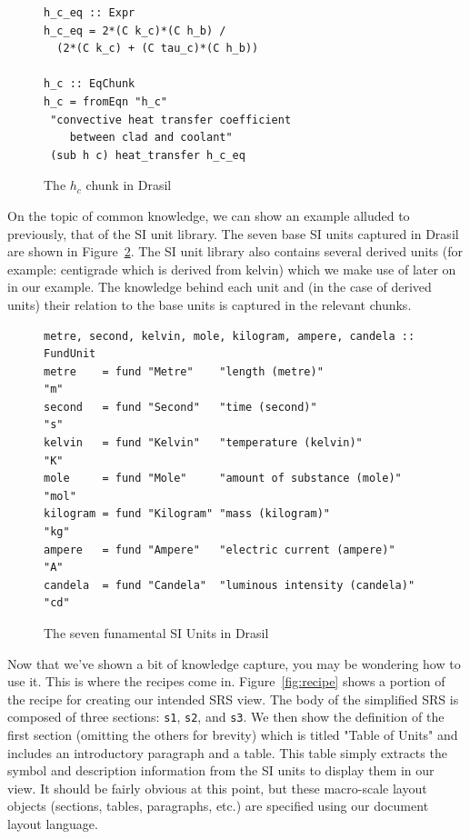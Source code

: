 \documentclass[preprint, 10pt]{sigplanconf}
\begin{document}
\begin{figure}
\begin{lstlisting}[frame=single, showstringspaces=false, basicstyle=\small]
h_c_eq :: Expr
h_c_eq = 2*(C k_c)*(C h_b) /
  (2*(C k_c) + (C tau_c)*(C h_b))

h_c :: EqChunk
h_c = fromEqn "h_c" 
 "convective heat transfer coefficient
    between clad and coolant"
 (sub h c) heat_transfer h_c_eq
\end{lstlisting}
\caption{The $h_c$ chunk in Drasil}
\label{fig:h_cChunk}
\end{figure}

On the topic of common knowledge, we can show an example alluded to previously,
that of the SI unit library. The seven base SI units captured in Drasil are
shown in Figure~\ref{fig:si_units}. The SI unit library also contains several
derived units (for example: centigrade which is derived from kelvin) which we
make use of later on in our example. The knowledge behind each unit and (in the
case of derived units) their relation to the base units is captured in the
relevant chunks.

\begin{figure}
\begin{lstlisting}[frame=single, showstringspaces=false]
metre, second, kelvin, mole, kilogram, ampere, candela :: FundUnit
metre    = fund "Metre"    "length (metre)"               "m"
second   = fund "Second"   "time (second)"                "s"
kelvin   = fund "Kelvin"   "temperature (kelvin)"         "K"
mole     = fund "Mole"     "amount of substance (mole)"   "mol"
kilogram = fund "Kilogram" "mass (kilogram)"              "kg"
ampere   = fund "Ampere"   "electric current (ampere)"    "A"
candela  = fund "Candela"  "luminous intensity (candela)" "cd"
\end{lstlisting}
\caption{The seven funamental SI Units in Drasil}
\label{fig:si_units}
\end{figure}

Now that we've shown a bit of knowledge capture, you may be wondering how to use
it. This is where the recipes come in. Figure~\ref{fig:recipe} shows a portion
of the recipe for creating our intended SRS view. The body of the simplified SRS
is composed of three sections: \verb|s1|, \verb|s2|, and \verb|s3|. We then show
the definition of the first section (omitting the others for brevity) which is
titled "Table of Units" and includes an introductory paragraph and a table. This
table simply extracts the symbol and description information from the SI units
to display them in our view. It should be fairly obvious at this point, but
these macro-scale layout objects (sections, tables, paragraphs, etc.) are
specified using our document layout language.
\end{document}
